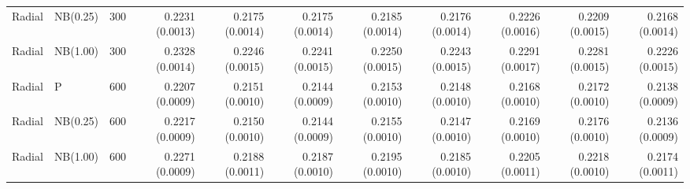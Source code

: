 \begin{table}[p]
{\begin{tabular}{lllrrrrrrrr}
Radial & NB(0.25) & 300 & 0.2231 (0.0013) & 0.2175 (0.0014) & 0.2175 (0.0014) & 0.2185 (0.0014) & 0.2176 (0.0014) & 0.2226 (0.0016) & 0.2209 (0.0015) & 0.2168 (0.0014) \\
Radial & NB(1.00) & 300 & 0.2328 (0.0014) & 0.2246 (0.0015) & 0.2241 (0.0015) & 0.2250 (0.0015) & 0.2243 (0.0015) & 0.2291 (0.0017) & 0.2281 (0.0015) & 0.2226 (0.0015) \\
Radial & P & 600 & 0.2207 (0.0009) & 0.2151 (0.0010) & 0.2144 (0.0009) & 0.2153 (0.0010) & 0.2148 (0.0010) & 0.2168 (0.0010) & 0.2172 (0.0010) & 0.2138 (0.0009) \\
Radial & NB(0.25) & 600 & 0.2217 (0.0009) & 0.2150 (0.0010) & 0.2144 (0.0009) & 0.2155 (0.0010) & 0.2147 (0.0010) & 0.2169 (0.0010) & 0.2176 (0.0010) & 0.2136 (0.0009) \\
Radial & NB(1.00) & 600 & 0.2271 (0.0009) & 0.2188 (0.0011) & 0.2187 (0.0010) & 0.2195 (0.0010) & 0.2185 (0.0010) & 0.2205 (0.0011) & 0.2218 (0.0010) & 0.2174 (0.0011) \\
\hline
\end{tabular}%
}
\end{table}
